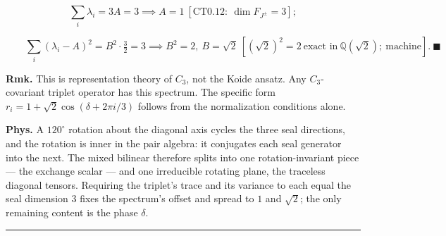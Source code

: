 \begin{theorem}
\[
\sum_i\lambda_i=3A=3\implies A=1\ [\mathrm{CT0.12}:\ \dim F_{J^\pm}=3];
\]

\[
\qquad \sum_i(\lambda_i-A)^2=B^2\cdot\tfrac32=3\implies B^2=2,\ B=\sqrt2\ [(\sqrt2)^2=2\ \text{exact in}\ \mathbb Q(\sqrt2);\ \text{machine}].\ \blacksquare
\]

\textbf{Rmk.} This is representation theory of $C_3$, not the Koide ansatz. Any $C_3$-covariant triplet operator has this spectrum. The specific form $r_i=1+\sqrt2\cos(\delta+2\pi i/3)$ follows from the normalization conditions alone.

\textbf{Phys.} A $120^\circ$ rotation about the diagonal axis cycles the three seal directions, and the rotation is inner in the pair algebra: it conjugates each seal generator into the next. The mixed bilinear therefore splits into one rotation-invariant piece — the exchange scalar — and one irreducible rotating plane, the traceless diagonal tensors. Requiring the triplet's trace and its variance to each equal the seal dimension $3$ fixes the spectrum's offset and spread to $1$ and $\sqrt2$; the only remaining content is the phase $\delta$.

\vspace{2pt}\noindent\rule{\textwidth}{0.4pt}\vspace{2pt}

\end{theorem}

